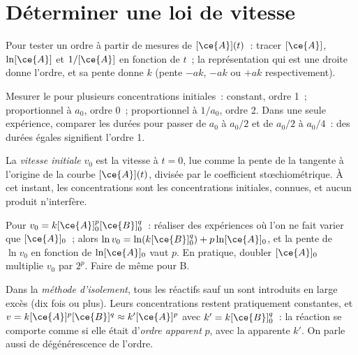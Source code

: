 \section{Déterminer une loi de vitesse}

\begin{method}\label{met:b1:rate-laws:integral}
Pour tester un ordre à partir de mesures de $[\ce{A}](t)$~: tracer
$[\ce{A}]$, $\ln[\ce{A}]$ et $1/[\ce{A}]$ en fonction de $t$~; la
représentation qui est une droite donne l'ordre, et sa pente donne $k$
(pente $-ak$, $-ak$ ou $+ak$ respectivement).
\end{method}

\begin{method}\label{met:b1:rate-laws:half-life}
Mesurer le  pour plusieurs concentrations
initiales~: constant, ordre 1~; proportionnel à $a_0$, ordre 0~;
proportionnel à $1/a_0$, ordre 2. Dans une seule expérience, comparer les
durées pour passer de $a_0$ à $a_0/2$ et de $a_0/2$ à $a_0/4$~: des
durées égales signifient l'ordre 1.
\end{method}

\begin{definition}\label{def:b1:rate-laws:initial-rate}
La \emph{vitesse initiale} $v_0$ est la vitesse à $t = 0$,
lue comme la pente de la tangente à l'origine de la courbe $[\ce{A}](t)$,
divisée par le coefficient stœchiométrique. À cet instant, les
concentrations sont les concentrations initiales, connues, et aucun
produit n'interfère.
\end{definition}

\begin{method}\label{met:b1:rate-laws:initial-rates}
Pour $v_0 = k[\ce{A}]_0^p[\ce{B}]_0^q$~: réaliser des expériences où
l'on ne fait varier que $[\ce{A}]_0$~; alors
$\ln v_0 = \ln(k[\ce{B}]_0^q) + p\ln[\ce{A}]_0$,
et la pente de $\ln v_0$ en fonction de $\ln[\ce{A}]_0$ vaut $p$. En
pratique, doubler $[\ce{A}]_0$ multiplie $v_0$ par $2^p$. Faire de même
pour B.
\end{method}

\begin{definition}\label{def:b1:rate-laws:apparent-order}
Dans la \emph{méthode d'isolement}, tous les réactifs sauf un
sont introduits en large excès (dix fois ou plus). Leurs concentrations
restent pratiquement constantes, et
$v = k[\ce{A}]^p[\ce{B}]^q \approx k'[\ce{A}]^p$
avec $k' = k[\ce{B}]_0^q$~: la réaction se comporte comme si elle était
d'\emph{ordre apparent} $p$, avec la 
apparente $k'$. On parle aussi de dégénérescence de l'ordre.
\end{definition}

